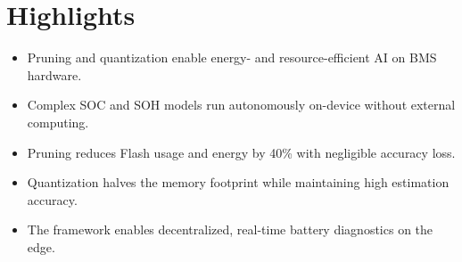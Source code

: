 \documentclass[12pt]{article}
\begin{document}
\section*{Highlights}

\begin{itemize}
    \item Pruning and quantization enable energy- and resource-efficient AI on BMS hardware.
    \item Complex SOC and SOH models run autonomously on-device without external computing.
    \item Pruning reduces Flash usage and energy by 40\% with negligible accuracy loss.
    \item Quantization halves the memory footprint while maintaining high estimation accuracy.
    \item The framework enables decentralized, real-time battery diagnostics on the edge.
\end{itemize}
\end{document}
